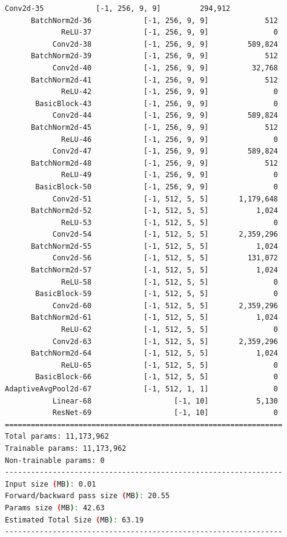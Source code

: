 \documentclass[a4paper, 12pt]{article}
\begin{document}
\begin{lstlisting}[language=sh]
           Conv2d-35            [-1, 256, 9, 9]         294,912
      BatchNorm2d-36            [-1, 256, 9, 9]             512
             ReLU-37            [-1, 256, 9, 9]               0
           Conv2d-38            [-1, 256, 9, 9]         589,824
      BatchNorm2d-39            [-1, 256, 9, 9]             512
           Conv2d-40            [-1, 256, 9, 9]          32,768
      BatchNorm2d-41            [-1, 256, 9, 9]             512
             ReLU-42            [-1, 256, 9, 9]               0
       BasicBlock-43            [-1, 256, 9, 9]               0
           Conv2d-44            [-1, 256, 9, 9]         589,824
      BatchNorm2d-45            [-1, 256, 9, 9]             512
             ReLU-46            [-1, 256, 9, 9]               0
           Conv2d-47            [-1, 256, 9, 9]         589,824
      BatchNorm2d-48            [-1, 256, 9, 9]             512
             ReLU-49            [-1, 256, 9, 9]               0
       BasicBlock-50            [-1, 256, 9, 9]               0
           Conv2d-51            [-1, 512, 5, 5]       1,179,648
      BatchNorm2d-52            [-1, 512, 5, 5]           1,024
             ReLU-53            [-1, 512, 5, 5]               0
           Conv2d-54            [-1, 512, 5, 5]       2,359,296
      BatchNorm2d-55            [-1, 512, 5, 5]           1,024
           Conv2d-56            [-1, 512, 5, 5]         131,072
      BatchNorm2d-57            [-1, 512, 5, 5]           1,024
             ReLU-58            [-1, 512, 5, 5]               0
       BasicBlock-59            [-1, 512, 5, 5]               0
           Conv2d-60            [-1, 512, 5, 5]       2,359,296
      BatchNorm2d-61            [-1, 512, 5, 5]           1,024
             ReLU-62            [-1, 512, 5, 5]               0
           Conv2d-63            [-1, 512, 5, 5]       2,359,296
      BatchNorm2d-64            [-1, 512, 5, 5]           1,024
             ReLU-65            [-1, 512, 5, 5]               0
       BasicBlock-66            [-1, 512, 5, 5]               0
AdaptiveAvgPool2d-67            [-1, 512, 1, 1]               0
           Linear-68                   [-1, 10]           5,130
           ResNet-69                   [-1, 10]               0
================================================================
Total params: 11,173,962
Trainable params: 11,173,962
Non-trainable params: 0
----------------------------------------------------------------
Input size (MB): 0.01
Forward/backward pass size (MB): 20.55
Params size (MB): 42.63
Estimated Total Size (MB): 63.19
----------------------------------------------------------------
\end{lstlisting}
\end{document}
